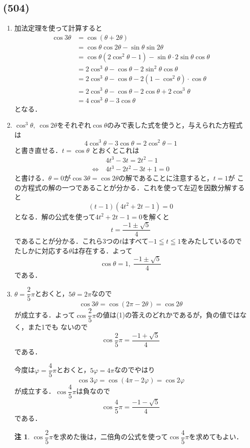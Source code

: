 \documentclass[dvipdfmx,twocolumn,uplatex]{jsarticle}
\theoremstyle{definition}
\newtheorem*{remark}{注}
\begin{document}
    \subsection*{(504)}
    \begin{enumerate}[label=(\arabic*)]
        \item 加法定理を使って計算すると
        \begin{align*}
            \cos 3\theta&=\cos(\theta+2\theta)\\
            &=\cos\theta\cos 2\theta-\sin\theta\sin 2\theta\\
            &=\cos\theta(2\cos^2\theta-1)-\sin\theta\cdot 2\sin\theta\cos\theta\\
            &=2\cos^3\theta-\cos\theta-2\sin^2\theta\cos\theta\\
            &=2\cos^3\theta-\cos\theta-2(1-\cos^2\theta)\cdot\cos\theta\\
            &=2\cos^3\theta-\cos\theta-2\cos\theta+2\cos^3\theta\\
            &=\boxed{4\cos^3\theta-3\cos\theta}
        \end{align*}
        となる．
        
        \item $\cos^3\theta,\ \cos2\theta$をそれぞれ$\cos\theta$のみで表した式を使うと，与えられた方程式は
        \[4\cos^3\theta-3\cos\theta=2\cos^2\theta-1 \]
        と書き直せる．$t=\cos\theta$
        とおくとこれは
        \begin{align*}
            &4t^3-3t=2t^2-1 \\
            \iff\ &4t^3-2t^2-3t+1=0
        \end{align*}
        と書ける．$\theta=0$が$\cos3\theta=\cos2\theta$の解であることに注意すると，$t=1$が
        この方程式の解の一つであることが分かる．これを使って左辺を因数分解すると
        \[ (t-1)(4t^2+2t-1)=0 \]
        となる．解の公式を使って$4t^2+2t-1=0$を解くと
        \[t=\frac{-1\pm \sqrt{5}}{4} \]
        であることが分かる．これら3つの$t$はすべて$-1\leqq t\leqq 1$をみたしているのでたしかに対応する$\theta$は存在する．よって
        \[\boxed{\cos\theta=1,\ \frac{-1\pm\sqrt{5}}{4}} \]
        である．
        
        \item $\theta=\dfrac{2}{5}\pi$とおくと，$5\theta=2\pi$なので
        \[\cos3\theta=\cos(2\pi-2\theta)=\cos2\theta \]
        が成立する．よって$\cos\dfrac{2}{5}\pi$の値は(1)の答えのどれかであるが，負の値ではなく，また1でも
        ないので
        \[\boxed{\cos\frac{2}{5}\pi=\frac{-1+\sqrt{5}}{4}} \]
        である．
        
        今度は$\varphi=\dfrac{4}{5}\pi$とおくと，$5\varphi=4\pi$なのでやはり
        \[\cos 3\varphi=\cos(4\pi-2\varphi)=\cos 2\varphi \]
        が成立する．$\cos\dfrac{4}{5}\pi$は負なので
        \[\boxed{\cos\frac{4}{5}\pi=\frac{-1-\sqrt{5}}{4}}\]
        である．
        \begin{remark}
        $\cos\dfrac{2}{5}\pi$を求めた後は，二倍角の公式を使って$\cos\dfrac{4}{5}\pi$を求めてもよい．
        \end{remark}
        \end{enumerate}
        
\end{document}
